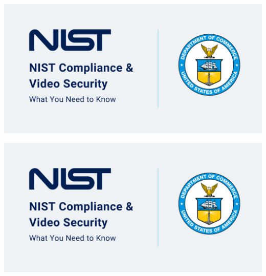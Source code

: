 \subsection{\slidetitle}
\begin{frame}
  \frametitle{\sectiontitle}
  \framesubtitle{\slidetitle}

  \begin{minipage}[h!]{0.45\textwidth}
    \includegraphics[scale=0.2]{./img/example-image.png}
  \end{minipage}\hfill
  \begin{minipage}[h!]{0.45\textwidth}
    \includegraphics[scale=0.2]{./img/example-image.png}
  \end{minipage}
\end{frame}
